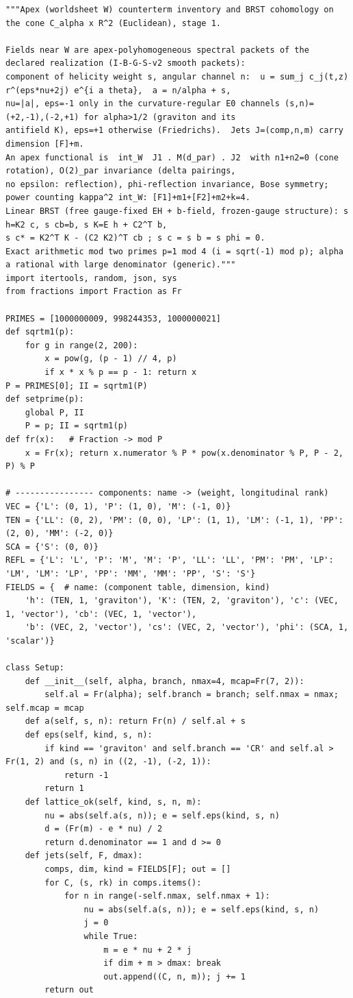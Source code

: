 \documentclass[10pt]{article}
\begin{document}
\begin{lstlisting}
"""Apex (worldsheet W) counterterm inventory and BRST cohomology on the cone C_alpha x R^2 (Euclidean), stage 1.

Fields near W are apex-polyhomogeneous spectral packets of the declared realization (I-B-G-S-v2 smooth packets):
component of helicity weight s, angular channel n:  u = sum_j c_j(t,z) r^(eps*nu+2j) e^{i a theta},  a = n/alpha + s,
nu=|a|, eps=-1 only in the curvature-regular E0 channels (s,n)=(+2,-1),(-2,+1) for alpha>1/2 (graviton and its
antifield K), eps=+1 otherwise (Friedrichs).  Jets J=(comp,n,m) carry dimension [F]+m.
An apex functional is  int_W  J1 . M(d_par) . J2  with n1+n2=0 (cone rotation), O(2)_par invariance (delta pairings,
no epsilon: reflection), phi-reflection invariance, Bose symmetry; power counting kappa^2 int_W: [F1]+m1+[F2]+m2+k=4.
Linear BRST (free gauge-fixed EH + b-field, frozen-gauge structure): s h=K2 c, s cb=b, s K=E h + C2^T b,
s c* = K2^T K - (C2 K2)^T cb ; s c = s b = s phi = 0.
Exact arithmetic mod two primes p=1 mod 4 (i = sqrt(-1) mod p); alpha a rational with large denominator (generic)."""
import itertools, random, json, sys
from fractions import Fraction as Fr

PRIMES = [1000000009, 998244353, 1000000021]
def sqrtm1(p):
    for g in range(2, 200):
        x = pow(g, (p - 1) // 4, p)
        if x * x % p == p - 1: return x
P = PRIMES[0]; II = sqrtm1(P)
def setprime(p):
    global P, II
    P = p; II = sqrtm1(p)
def fr(x):   # Fraction -> mod P
    x = Fr(x); return x.numerator % P * pow(x.denominator % P, P - 2, P) % P

# ---------------- components: name -> (weight, longitudinal rank)
VEC = {'L': (0, 1), 'P': (1, 0), 'M': (-1, 0)}
TEN = {'LL': (0, 2), 'PM': (0, 0), 'LP': (1, 1), 'LM': (-1, 1), 'PP': (2, 0), 'MM': (-2, 0)}
SCA = {'S': (0, 0)}
REFL = {'L': 'L', 'P': 'M', 'M': 'P', 'LL': 'LL', 'PM': 'PM', 'LP': 'LM', 'LM': 'LP', 'PP': 'MM', 'MM': 'PP', 'S': 'S'}
FIELDS = {  # name: (component table, dimension, kind)
    'h': (TEN, 1, 'graviton'), 'K': (TEN, 2, 'graviton'), 'c': (VEC, 1, 'vector'), 'cb': (VEC, 1, 'vector'),
    'b': (VEC, 2, 'vector'), 'cs': (VEC, 2, 'vector'), 'phi': (SCA, 1, 'scalar')}

class Setup:
    def __init__(self, alpha, branch, nmax=4, mcap=Fr(7, 2)):
        self.al = Fr(alpha); self.branch = branch; self.nmax = nmax; self.mcap = mcap
    def a(self, s, n): return Fr(n) / self.al + s
    def eps(self, kind, s, n):
        if kind == 'graviton' and self.branch == 'CR' and self.al > Fr(1, 2) and (s, n) in ((2, -1), (-2, 1)):
            return -1
        return 1
    def lattice_ok(self, kind, s, n, m):
        nu = abs(self.a(s, n)); e = self.eps(kind, s, n)
        d = (Fr(m) - e * nu) / 2
        return d.denominator == 1 and d >= 0
    def jets(self, F, dmax):
        comps, dim, kind = FIELDS[F]; out = []
        for C, (s, rk) in comps.items():
            for n in range(-self.nmax, self.nmax + 1):
                nu = abs(self.a(s, n)); e = self.eps(kind, s, n)
                j = 0
                while True:
                    m = e * nu + 2 * j
                    if dim + m > dmax: break
                    out.append((C, n, m)); j += 1
        return out


\end{lstlisting}
\end{document}
